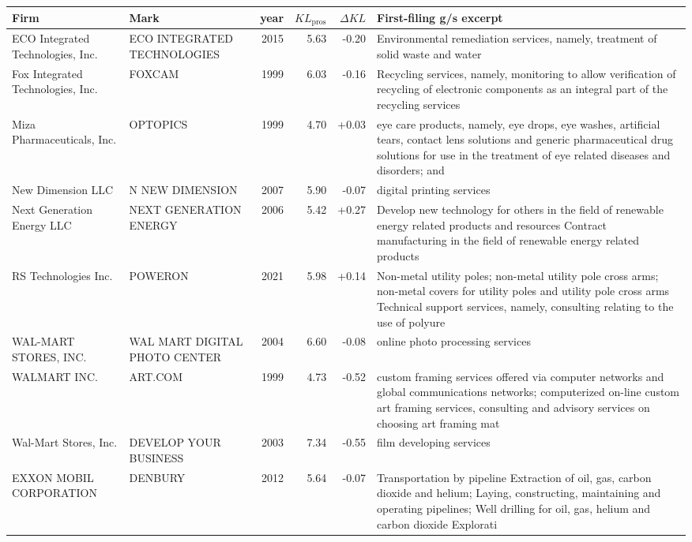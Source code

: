 \begin{tabular}{p{4.0cm}p{2.2cm}rrrp{6.5cm}}
\toprule
Firm & Mark & year & $KL_\text{pros}$ & $\Delta KL$ & First-filing g/s excerpt \\
\midrule
ECO Integrated Technologies, Inc. & ECO INTEGRATED TECHNOLOGIES & 2015 & 5.63 & -0.20 & Environmental remediation services, namely, treatment of solid waste and water \\
Fox Integrated Technologies, Inc. & FOXCAM & 1999 & 6.03 & -0.16 & Recycling services, namely, monitoring to allow verification of recycling of electronic components as an integral part of the recycling services \\
Miza Pharmaceuticals, Inc. & OPTOPICS & 1999 & 4.70 & +0.03 & eye care products, namely, eye drops, eye washes, artificial tears, contact lens solutions and generic pharmaceutical drug solutions for use in the treatment of eye related diseases and disorders; and \\
New Dimension LLC & N NEW DIMENSION & 2007 & 5.90 & -0.07 & digital printing services \\
Next Generation Energy LLC & NEXT GENERATION ENERGY & 2006 & 5.42 & +0.27 & Develop new technology for others in the field of renewable energy related products and resources Contract manufacturing in the field of renewable energy related products \\
RS Technologies Inc. & POWERON & 2021 & 5.98 & +0.14 & Non-metal utility poles; non-metal utility pole cross arms; non-metal covers for utility poles and utility pole cross arms Technical support services, namely, consulting relating to the use of polyure \\
WAL-MART STORES, INC. & WAL MART DIGITAL PHOTO CENTER & 2004 & 6.60 & -0.08 & online photo processing services \\
WALMART INC. & ART.COM & 1999 & 4.73 & -0.52 & custom framing services offered via computer networks and global communications networks; computerized on-line custom art framing services, consulting and advisory services on choosing art framing mat \\
Wal-Mart Stores, Inc. & DEVELOP YOUR BUSINESS & 2003 & 7.34 & -0.55 & film developing services \\
EXXON MOBIL CORPORATION & DENBURY & 2012 & 5.64 & -0.07 & Transportation by pipeline Extraction of oil, gas, carbon dioxide and helium; Laying, constructing, maintaining and operating pipelines; Well drilling for oil, gas, helium and carbon dioxide Explorati \\
\bottomrule
\end{tabular}
\clearpage

